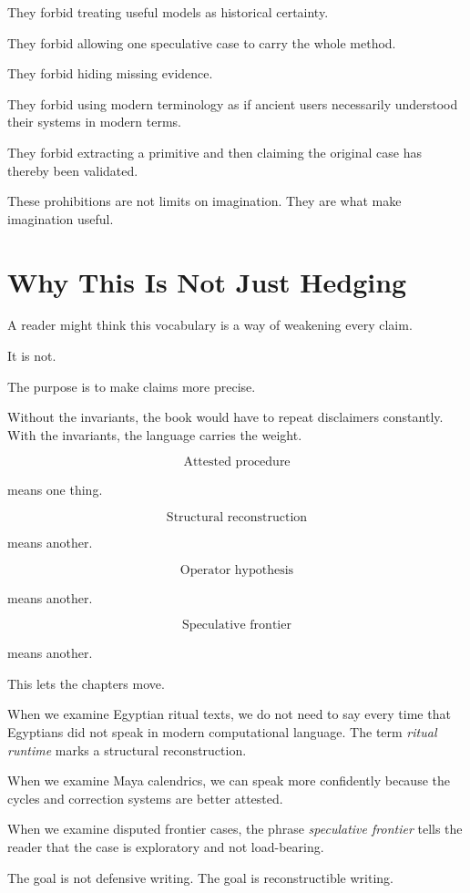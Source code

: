 \documentclass[11pt]{book}
\begin{document}
They forbid treating useful models as historical certainty.

They forbid allowing one speculative case to carry the whole method.

They forbid hiding missing evidence.

They forbid using modern terminology as if ancient users necessarily understood their systems in modern terms.

They forbid extracting a primitive and then claiming the original case has thereby been validated.

These prohibitions are not limits on imagination. They are what make imagination useful.

\section{Why This Is Not Just Hedging}

A reader might think this vocabulary is a way of weakening every claim.

It is not.

The purpose is to make claims more precise.

Without the invariants, the book would have to repeat disclaimers constantly. With the invariants, the language carries the weight.

\[
\text{Attested procedure}
\]

means one thing.

\[
\text{Structural reconstruction}
\]

means another.

\[
\text{Operator hypothesis}
\]

means another.

\[
\text{Speculative frontier}
\]

means another.

This lets the chapters move.

When we examine Egyptian ritual texts, we do not need to say every time that Egyptians did not speak in modern computational language. The term \emph{ritual runtime} marks a structural reconstruction.

When we examine Maya calendrics, we can speak more confidently because the cycles and correction systems are better attested.

When we examine disputed frontier cases, the phrase \emph{speculative frontier} tells the reader that the case is exploratory and not load-bearing.

The goal is not defensive writing. The goal is reconstructible writing.
\end{document}
